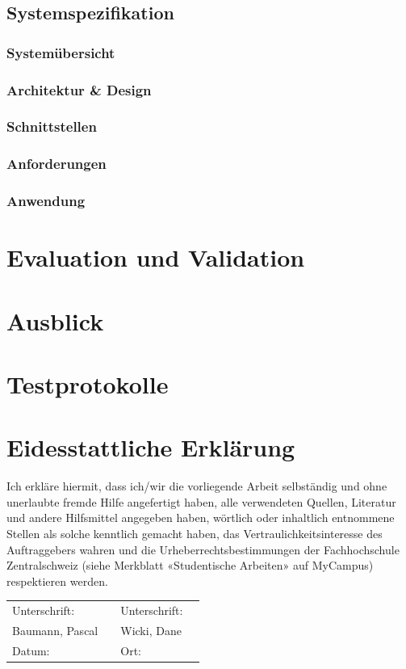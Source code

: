 \documentclass[a4paper]{scrreprt}
\begin{document}
\section{Systemspezifikation}

\subsection{Systemübersicht}

\subsection{Architektur \& Design}

\subsection{Schnittstellen}

\subsection{Anforderungen}

\subsection{Anwendung}

\chapter{Evaluation und Validation}




\chapter{Ausblick}

\appendix

\chapter{Testprotokolle}



\listoffigures

\listoftables

\listofmyequations \pagebreak

\printbibliography

\chapter*{Eidesstattliche Erklärung}
Ich erkläre hiermit, dass ich/wir die vorliegende Arbeit selbständig und ohne unerlaubte fremde Hilfe angefertigt haben, alle verwendeten Quellen, Literatur und andere Hilfsmittel angegeben haben, wörtlich oder inhaltlich entnommene Stellen als solche kenntlich gemacht haben, das Vertraulichkeitsinteresse des Auftraggebers wahren und die Urheberrechtsbestimmungen der Fachhochschule Zentralschweiz (siehe Merkblatt «Studentische Arbeiten» auf MyCampus) respektieren werden.

\vspace{1em}

\renewcommand{\arraystretch}{2}
\begin{tabularx}{\textwidth}{XXXX}
	Unterschrift: & & Unterschrift: & \\ \cline{2-2}\cline{4-4}
	Baumann, Pascal & & Wicki, Dane & \\
	Datum: & & Ort: & \\
\end{tabularx}
\end{document}
